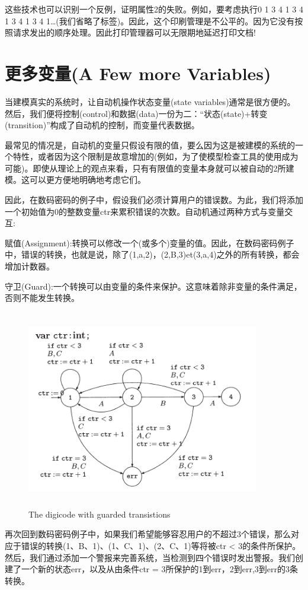\documentclass{book}
\begin{document}
    这些技术也可以识别一个反例，证明属性2的失败。例如，要考虑执行0 1 3 4 1 3 4 1 3 4 1 3 4 1…(我们省略了标签)。因此，这个印刷管理是不公平的。因为它没有按照请求发出的顺序处理。因此打印管理器可以无限期地延迟打印文档!

    \section{更多变量(A Few more Variables)}
    当建模真实的系统时，让自动机操作状态变量(state variables)通常是很方便的。然后，我们便将控制(control)和数据(data)一份为二：“状态(state)+转变(transition)”构成了自动机的控制，而变量代表数据。

    最常见的情况是，自动机的变量只假设有限的值，要么因为这是被建模的系统的一个特性，或者因为这个限制是故意增加的(例如，为了使模型检查工具的使用成为可能)。即使从理论上的观点来看，只有有限值的变量本身就可以被自动的2所建模。这可以更方便地明确地考虑它们。

    因此，在数码密码的例子中，假设我们必须计算用户的错误数。为此，我们将添加一个初始值为0的整数变量ctr来累积错误的次数。自动机通过两种方式与变量交互:

    赋值(Assignment):转换可以修改一个(或多个)变量的值。因此，在数码密码例子中，错误的转换，也就是说，除了(1,a,2)，(2,B,3)et(3,a,4)之外的所有转换，都会增加计数器。

    守卫(Guard):一个转换可以由变量的条件来保护。这意味着除非变量的条件满足，否则不能发生转换。

    \begin{figure}
    \centering
    \includegraphics[height=3.4in,width=4.0in]{1_7.png}
    \caption{The digicode with guarded transistions}
    \end{figure}
    再次回到数码密码例子中，如果我们希望能够容忍用户的不超过3个错误，那么对应于错误的转换(1、B、1)、(1、C、1)、(2、C、1)等将被ctr < 3的条件所保护。然后，我们通过添加一个警报来完善系统，当检测到四个错误时发出警报。我们创建了一个新的状态err，以及从由条件ctr = 3所保护的1到err，2到err,3到err的3条转换。
\end{document}
